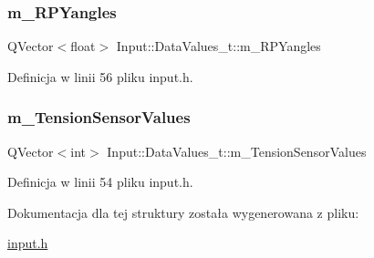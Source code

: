 \subsubsection{\texorpdfstring{m\+\_\+\+R\+P\+Yangles}{m\_RPYangles}}
{\footnotesize\ttfamily Q\+Vector$<$float$>$ Input\+::\+Data\+Values\+\_\+t\+::m\+\_\+\+R\+P\+Yangles}



Definicja w linii 56 pliku input.\+h.

\mbox{\label{struct_input_1_1_data_values__t_af7c9130fde76cd77104840c5e51c2f2a}} 
\subsubsection{\texorpdfstring{m\+\_\+\+Tension\+Sensor\+Values}{m\_TensionSensorValues}}
{\footnotesize\ttfamily Q\+Vector$<$int$>$ Input\+::\+Data\+Values\+\_\+t\+::m\+\_\+\+Tension\+Sensor\+Values}



Definicja w linii 54 pliku input.\+h.



Dokumentacja dla tej struktury została wygenerowana z pliku\+:\begin{DoxyCompactItemize}
\item 
\hyperlink{input_8h}{input.\+h}\end{DoxyCompactItemize}
